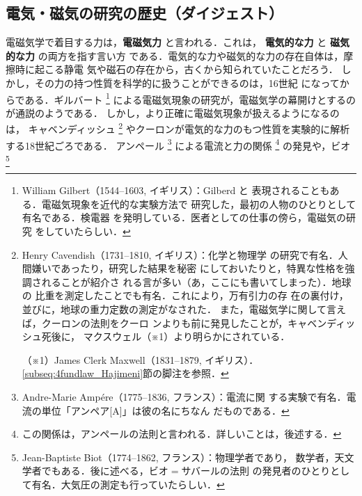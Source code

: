     \subsection{電気・磁気の研究の歴史（ダイジェスト）}
        電磁気学で着目する力は，\textbf{電磁気力} と言われる．これは，
        \textbf{電気的な力} と \textbf{磁気的な力} の両方を指す言い方
        である．電気的な力や磁気的な力の存在自体は，摩擦時に起こる静電
        気や磁石の存在から，古くから知られていたことだろう．
        しかし，その力の持つ性質を科学的に扱うことができるのは，16世紀
        になってからである．ギルバート
            \footnote{
                William Gilbert（1544--1603, イギリス）：Gilberd と
                表現されることもある．電磁気現象を近代的な実験方法で
                研究した，最初の人物のひとりとして有名である．検電器
                を発明している．医者としての仕事の傍ら，電磁気の研究
                をしていたらしい．
            }
        による電磁気現象の研究が，電磁気学の幕開けとするのが通説のようである．
        しかし，より正確に電磁気現象が扱えるようになるのは，
        キャベンディッシュ
            \footnote{
                Henry Cavendish（1731--1810, イギリス）：化学と物理学
                の研究で有名．人間嫌いであったり，研究した結果を秘密
                にしておいたりと，特異な性格を強調されることが紹介さ
                れる言が多い（あ，ここにも書いてしまった）．地球の
                比重を測定したことでも有名．これにより，万有引力の存
                在の裏付け，並びに，地球の重力定数の測定がなされた．
                また，電磁気学に関して言えば，クーロンの法則をクーロ
                ンよりも前に発見したことが，キャベンディッシュ死後に，
                マクスウェル（※1）より明らかにされている．

                （※1）James Clerk Maxwell（1831--1879, イギリス）．
                \ref{subseq:4fundlaw_Hajimeni}節の脚注を参照．
            }
        やクーロンが電気的な力のもつ性質を実験的に解析する18世紀ごろである．
        アンペール
            \footnote{
                Andre-Marie Amp\'{e}re（1775--1836, フランス）：電流に関
                する実験で有名．電流の単位「アンペア[A]」は彼の名にちなん
                だものである．
            }
        による電流と力の関係
            \footnote{
                この関係は，アンペールの法則と言われる．詳しいことは，後述する．
            }
        の発見や，ビオ
            \footnote{
                Jean-Baptiste Biot（1774--1862, フランス）：物理学者であり，
                数学者，天文学者でもある．後に述べる，ビオ$=$サバールの法則
                の発見者のひとりとして有名．大気圧の測定も行っていたらしい．
            }

